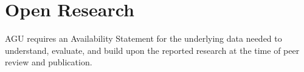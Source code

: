 \documentclass[draft]{agujournal2019}
\begin{document}
%
%
%
%
%
%
%
%
%
%

%
%


%
%




\section{Open Research}
AGU requires an Availability Statement for the underlying data needed to understand, evaluate, and build upon the reported research at the time of peer review and publication.
\end{document}
